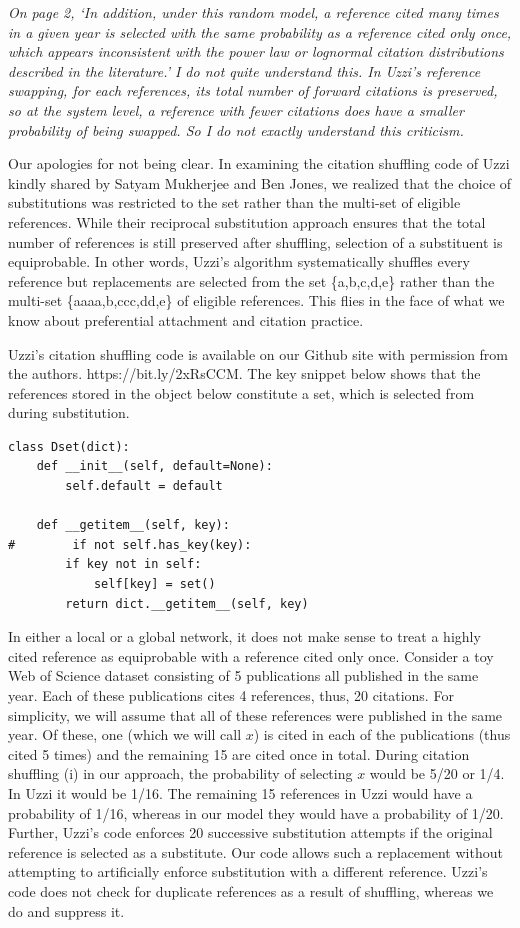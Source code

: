 \documentclass[11pt, oneside]{article}   	%
\begin{document}
 
\emph{On page 2, `In addition, under this random model, a reference cited many times in a given year is selected with the same probability as a reference cited only once, which appears inconsistent with the power law or lognormal citation distributions described in the literature.'  I do not quite understand this.  In Uzzi's reference swapping, for each references, its total number of forward citations is preserved, so at the system level, a reference with fewer citations does have a smaller probability of being swapped.  So I do not exactly understand this criticism.}

Our apologies for not being clear. In examining the citation shuffling code of Uzzi kindly shared by Satyam Mukherjee and Ben Jones, we realized that the choice of substitutions was restricted to the set rather than the multi-set of eligible references. While their reciprocal substitution approach  ensures that the total number of references is still preserved after shuffling, selection of a substituent is equiprobable. In other words, Uzzi's algorithm systematically shuffles every reference but replacements are selected from the set \{a,b,c,d,e\} rather than the multi-set \{aaaa,b,ccc,dd,e\} of eligible references. This flies in the face of what we know about preferential attachment and citation practice. 

Uzzi's citation shuffling code is available on our Github site with permission from the authors. https://bit.ly/2xRsCCM. The key snippet below shows that the references stored in the object below constitute a set, which is selected from during substitution. 

\begin{verbatim}
class Dset(dict):
    def __init__(self, default=None):
        self.default = default

    def __getitem__(self, key):
#        if not self.has_key(key):
        if key not in self:
            self[key] = set()
        return dict.__getitem__(self, key)
\end{verbatim}

In either a local or a global network, it does not make sense to treat a highly cited reference as equiprobable with a reference cited only once. Consider a toy Web of Science dataset consisting of 5 publications all published in the same year. Each of these publications cites 4 references, thus, 20 citations. For simplicity, we will assume that all of these references were published in the same year. Of these, one (which we will call $x$) is cited in each of the publications (thus cited 5 times) and the remaining 15 are cited once in total. During citation shuffling (i)  in our approach, the probability of selecting $x$ would be 5/20 or 1/4. In Uzzi it would be 1/16. The remaining 15 references in Uzzi would have a probability of 1/16, whereas in our model they would have a probability of 1/20. Further, Uzzi's code enforces 20 successive substitution attempts if the original reference is selected as a substitute. Our code allows such a replacement without attempting to artificially enforce substitution with a different reference. Uzzi's code does not check for duplicate references as a result of shuffling, whereas we do and suppress it.
\end{document}
